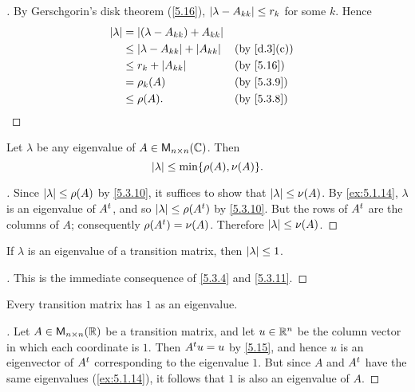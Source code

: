 \begin{proof}[]
	By Gerschgorin's disk theorem (\cref{5.16}), \(\left\lvert\lambda - A_{k k}\right\rvert \leq r_k\) for some \(k\).
	Hence
	\begin{align*}
		\abs{\lambda} & = \abs{(\lambda - A_{k k}) + A_{k k}}                         \\
		              & \leq \abs{\lambda - A_{k k}} + \abs{A_{k k}} &  & \by{d.3}[c] \\
		              & \leq r_k + \abs{A_{k k}}                     &  & \by{5.16}   \\
		              & = \rho_k(A)                                  &  & \by{5.3.9}  \\
		              & \leq \rho(A).                                &  & \by{5.3.8}
	\end{align*}
\end{proof}

\begin{cor}\label{5.3.11}
	Let \(\lambda\) be any eigenvalue of \(A \in \mathsf{M}_{{n} \times n}({\mathbb{C}})\).
	Then
	\[
		\abs{\lambda} \leq \min\set{\rho(A), \nu(A)}.
	\]
\end{cor}

\begin{proof}[]
	Since \(\left\lvert\lambda\right\rvert \leq \rho(A)\) by \cref{5.3.10}, it suffices to show that \(\left\lvert\lambda\right\rvert \leq \nu(A)\).
	By \cref{ex:5.1.14}, \(\lambda\) is an eigenvalue of \({A}^{t}\), and so \(\left\lvert\lambda\right\rvert \leq \rho({A}^{t})\) by \cref{5.3.10}.
	But the rows of \({A}^{t}\) are the columns of \(A\);
	consequently \(\rho({A}^{t}) = \nu(A)\).
	Therefore \(\left\lvert\lambda\right\rvert \leq \nu(A)\).
\end{proof}

\begin{cor}\label{5.3.12}
	If \(\lambda\) is an eigenvalue of a transition matrix, then \(\left\lvert\lambda\right\rvert \leq 1\).
\end{cor}

\begin{proof}[]
	This is the immediate consequence of \cref{5.3.4} and \cref{5.3.11}.
\end{proof}

\begin{thm}\label{5.17}
	Every transition matrix has \(1\) as an eigenvalue.
\end{thm}

\begin{proof}[]
	Let \(A \in \mathsf{M}_{{n} \times n}({\mathbb{R}})\) be a transition matrix, and let \(u \in \mathbb{R}^n\) be the column vector in which each coordinate is \(1\).
	Then \({A}^{t} u = u\) by \cref{5.15}, and hence \(u\) is an eigenvector of \({A}^{t}\) corresponding to the eigenvalue \(1\).
	But since \(A\) and \({A}^{t}\) have the same eigenvalues (\cref{ex:5.1.14}), it follows that \(1\) is also an eigenvalue of \(A\).
\end{proof}

